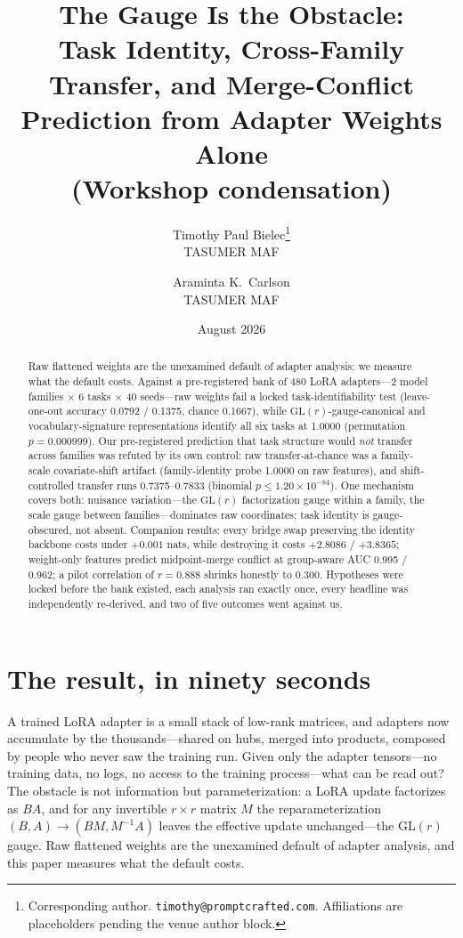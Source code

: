 \documentclass[10pt]{article}
\title{%
  The Gauge Is the Obstacle:\\
  \large Task Identity, Cross-Family Transfer, and Merge-Conflict
  Prediction from Adapter Weights Alone\\
  \normalsize (Workshop condensation)%
}
\author{%
  Timothy Paul Bielec\thanks{Corresponding author.
  \texttt{timothy@promptcrafted.com}. Affiliations are placeholders pending
  the venue author block.}\\
  TASUMER MAF\\
  \and
  Araminta K.\ Carlson\\
  TASUMER MAF\\
}
\date{August 2026}
\begin{document}
\maketitle

\begin{abstract}
Raw flattened weights are the unexamined default of adapter analysis; we
measure what the default costs. Against a pre-registered bank of 480 LoRA
adapters---2 model families $\times$ 6 tasks $\times$ 40 seeds---raw weights
fail a locked task-identifiability test (leave-one-out accuracy 0.0792 /
0.1375, chance 0.1667), while $\mathrm{GL}(r)$-gauge-canonical and
vocabulary-signature representations identify all six tasks at 1.0000
(permutation $p = 0.000999$). Our pre-registered prediction that task
structure would \emph{not} transfer across families was refuted by its own
control: raw transfer-at-chance was a family-scale covariate-shift artifact
(family-identity probe 1.0000 on raw features), and shift-controlled
transfer runs 0.7375--0.7833 (binomial $p \le 1.20\times10^{-84}$). One
mechanism covers both: nuisance variation---the $\mathrm{GL}(r)$
factorization gauge within a family, the scale gauge between
families---dominates raw coordinates; task identity is gauge-obscured, not
absent. Companion results: every bridge swap preserving the identity
backbone costs under $+0.001$ nats, while destroying it costs $+2.8086$ /
$+3.8365$; weight-only features predict midpoint-merge conflict at
group-aware AUC 0.995 / 0.962; a pilot correlation of $r = 0.888$ shrinks
honestly to 0.300. Hypotheses were locked before the bank existed, each
analysis ran exactly once, every headline was independently re-derived, and
two of five outcomes went against us.
\end{abstract}

\section{The result, in ninety seconds}
\label{sec:hook}

A trained LoRA adapter is a small stack of low-rank matrices, and adapters
now accumulate by the thousands---shared on hubs, merged into products,
composed by people who never saw the training run. Given only the adapter
tensors---no training data, no logs, no access to the training
process---what can be read out? The obstacle is not information but
parameterization: a LoRA update factorizes as $BA$, and for any invertible
$r \times r$ matrix $M$ the reparameterization $(B, A) \rightarrow (BM,
M^{-1}A)$ leaves the effective update unchanged---the $\mathrm{GL}(r)$
gauge. Raw flattened weights are the unexamined default of adapter
analysis, and this paper measures what the default costs.
\end{document}
